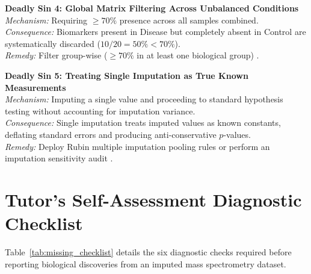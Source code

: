 \documentclass[11pt,oneside]{book}
\begin{document}
\begin{pitfallbox}
\textbf{Deadly Sin 4: Global Matrix Filtering Across Unbalanced Conditions}\\
\textit{Mechanism:} Requiring $\ge 70\%$ presence across all samples combined.\\
\textit{Consequence:} Biomarkers present in Disease but completely absent in Control are systematically discarded ($10/20 = 50\% < 70\%$).\\
\textit{Remedy:} Filter group-wise ($\ge 70\%$ in at least one biological group) \cite{zhang2018dep, webb2020review}.
\end{pitfallbox}

\begin{pitfallbox}
\textbf{Deadly Sin 5: Treating Single Imputation as True Known Measurements}\\
\textit{Mechanism:} Imputing a single value and proceeding to standard hypothesis testing without accounting for imputation variance.\\
\textit{Consequence:} Single imputation treats imputed values as known constants, deflating standard errors and producing anti-conservative $p$-values.\\
\textit{Remedy:} Deploy Rubin multiple imputation pooling rules or perform an imputation sensitivity audit \cite{rubin1987multiple, barnard1999small}.
\end{pitfallbox}

\section{Tutor's Self-Assessment Diagnostic Checklist}

Table~\ref{tab:missing_checklist} details the six diagnostic checks required before reporting biological discoveries from an imputed mass spectrometry dataset.
\end{document}
